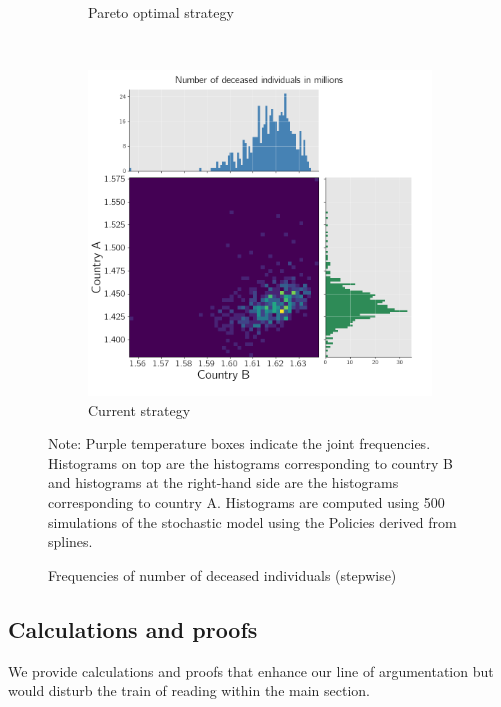 \begin{figure}[h!]
\begin{subfigure}[b]{0.49\textwidth}
         \caption{Pareto optimal strategy}
         \label{fig:2d_optimal_piecewise}
     \end{subfigure}
     \\
     \begin{subfigure}[b]{0.49\textwidth}
         \centering
         \includegraphics[width=\textwidth]{images/piecewise_stochastic_histogram_deceased_current.png}
         \caption{Current strategy}
         \label{fig:2d_piecewise}
     \end{subfigure}
\begin{flushleft}
\scriptsize{Note:} Purple temperature boxes indicate the joint frequencies. Histograms on top are the histograms corresponding to country B and histograms at the right-hand side are the histograms corresponding to country A. Histograms are computed using 500 simulations of the stochastic model using the Policies derived from splines. 
\end{flushleft}
        \caption{Frequencies of number of deceased individuals (stepwise)}
        \label{fig:histograms_piecewise} 
\end{figure}

\clearpage

\subsection{Calculations and proofs}
We provide calculations and proofs that enhance our line of argumentation but would disturb the train of reading within the main section.

